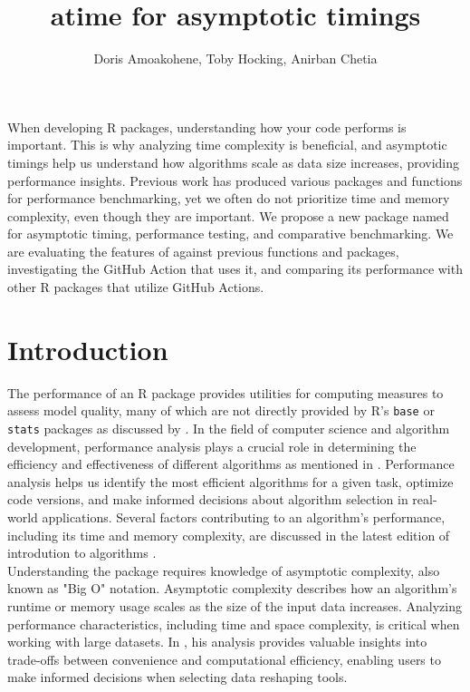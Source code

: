 \title{atime for asymptotic timings }
\author{Doris Amoakohene, Toby Hocking, Anirban Chetia}

\maketitle

\abstract{}
When developing R packages, understanding how your code performs is important. This is why analyzing time complexity is beneficial, and asymptotic timings help us understand how algorithms scale as data size increases, providing performance insights. Previous work has produced various packages and functions for performance benchmarking, yet we often do not prioritize time and memory complexity, even though they are important.
We propose a new package named  for asymptotic timing, performance testing, and comparative benchmarking. We are evaluating the features of  against previous functions and packages, investigating the GitHub Action that uses it, and comparing its performance with other R packages that utilize GitHub Actions. 

\section{Introduction}
The performance of an R package provides utilities for computing measures to assess model quality, many of which are not directly provided by R's \texttt{base} or \texttt{stats} packages as discussed by \cite{system.time}. In the field of computer science and algorithm development, performance analysis plays a crucial role in determining the efficiency and effectiveness of different algorithms as mentioned in \cite{knuth1997art}. Performance analysis helps us identify the most efficient algorithms for a given task, optimize code versions, and make informed decisions about algorithm selection in real-world applications. Several factors contributing to an algorithm's performance, including its time and memory complexity, are discussed in the latest edition of introdution to algorithms \cite{cormen2022introduction}.\\

\noindent Understanding the  package requires knowledge of asymptotic complexity, also known as "Big O" notation. Asymptotic complexity describes how an algorithm's runtime or memory usage scales as the size of the input data increases. Analyzing performance characteristics, including time and space complexity, is critical when working with large datasets. In \cite{Hocking2021}, his analysis provides valuable insights into trade-offs between convenience and computational efficiency, enabling users to make informed decisions when selecting data reshaping tools.
 
